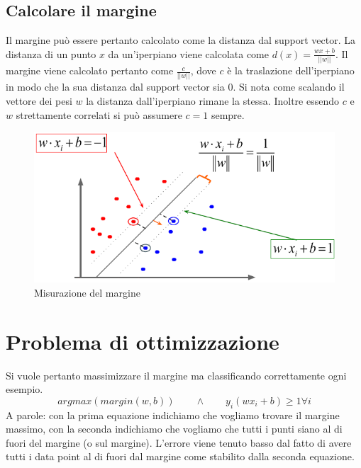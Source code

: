 	\subsection{Calcolare il margine}
	Il margine pu\`o essere pertanto calcolato come la distanza dal support vector.
	La distanza di un punto $x$ da un'iperpiano viene calcolata come $d(x) = \frac{wx+b}{||w||}$.
	Il margine viene calcolato pertanto come $\frac{c}{||w||}$, dove $c$ \`e la traslazione dell'iperpiano in modo che la sua distanza dal support vector sia $0$.
	Si nota come scalando il vettore dei pesi $w$ la distanza dall'iperpiano rimane la stessa.
	Inoltre essendo $c$ e $w$ strettamente correlati si pu\`o assumere $c=1$ sempre.
	
	\begin{figure}
		\centering
		\includegraphics[width=0.6\linewidth]{imgs/chapter10/img0}
		\caption{Misurazione del margine}
		\label{fig:chapter10-00}
	\end{figure}

\section{Problema di ottimizzazione}
Si vuole pertanto massimizzare il margine ma classificando correttamente ogni esempio.
$$argmax(margin(w,b))\qquad\land\qquad y_i(wx_i + b) \ge 1 \forall i$$
A parole: con la prima equazione indichiamo che vogliamo trovare il margine massimo, con la seconda indichiamo che vogliamo che tutti i punti siano al di fuori del margine (o sul margine).
L'errore viene tenuto basso dal fatto di avere tutti i data point al di fuori dal margine come stabilito dalla seconda equazione.

